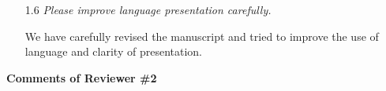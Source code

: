 \documentclass[11pt,onecolumn]{IEEEtran}
\begin{document}
\begin{enumerate}
\vspace{2mm} 

\vspace*{3mm}

\item [1.6] {\em  Please improve language presentation carefully.}

\vspace*{2mm}
We have carefully revised the manuscript and tried to improve the use of language and clarity of presentation. 
\vspace*{3mm}






\end{enumerate}


\begin{center}
{\bf\large Comments of Reviewer \#2}
\vspace{1mm}
\end{center}
\end{document}
